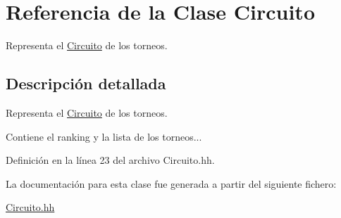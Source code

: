 \hypertarget{class_circuito}{}\section{Referencia de la Clase Circuito}
\label{class_circuito}


Representa el \mbox{\hyperlink{class_circuito}{Circuito}} de los torneos.  




\subsection{Descripción detallada}
Representa el \mbox{\hyperlink{class_circuito}{Circuito}} de los torneos. 

Contiene el ranking y la lista de los torneos... 

Definición en la línea 23 del archivo Circuito.\+hh.



La documentación para esta clase fue generada a partir del siguiente fichero\+:\begin{DoxyCompactItemize}
\item 
\mbox{\hyperlink{_circuito_8hh}{Circuito.\+hh}}\end{DoxyCompactItemize}
